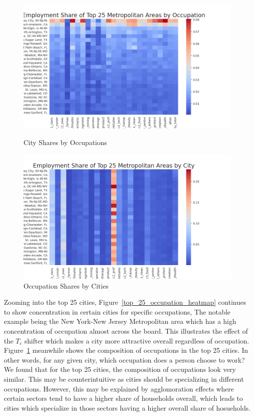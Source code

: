 \documentclass[10pt]{article}
\begin{document}
\begin{figure}[!htb]
    \begin{minipage}{0.5\textwidth}
        \centering
        \includegraphics[width=\textwidth]{../../estimations/graphs/top_25_occupaiton_heatmap.png}
        \caption{City Shares by Occupations}
        \label{top_25_occupation_heatmap}
    \end{minipage}
    \begin{minipage}{0.5\textwidth}
        \centering
        \includegraphics[width=\textwidth]{../../estimations/graphs/top_25_city_heatmap.png}
        \caption{Occupation Shares by Cities}
        \label{top_25_city_heatmap}
    \end{minipage}
\end{figure}

Zooming into the top 25 cities, Figure~\ref{top_25_occupation_heatmap} continues to show concentration in certain cities for specific occupations, The notable example being the New York-New Jersey Metropolitan area which has a high concentration of occupation almost across the board. This illustrates the effect of the $T_c$ shifter which makes a city more attractive overall regardless of occupation. Figure~\ref{top_25_city_heatmap} meanwhile shows the composition of occupations in the top 25 cities. In other words, for any given city, which occupation does a person choose to work? We found that for the top 25 cities, the composition of occupations look very similar. This may be counterintuitive as cities should be specializing in different occupations. However, this may be explained by agglomoration effects where certain sectors tend to have a higher share of households overall, which leads to cities which specialize in those sectors having a higher overall share of hosueholds.
\end{document}
